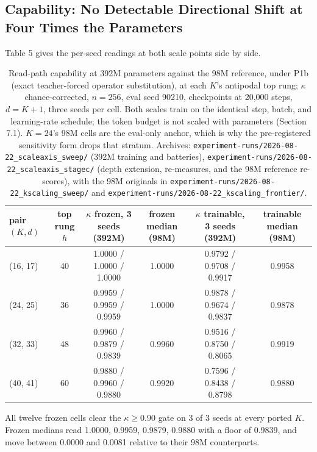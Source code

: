 \subsection{Capability: No Detectable Directional Shift at Four Times the Parameters}

Table 5 gives the per-seed readings at both scale points side by side.

\begin{table}[t]
\centering
\caption{Read-path capability at 392M parameters against the 98M reference, under P1b (exact teacher-forced operator substitution), at each $K$'s antipodal top rung; $\kappa$ chance-corrected, $n{=}256$, eval seed 90210, checkpoints at 20,000 steps, $d = K{+}1$, three seeds per cell. Both scales train on the identical step, batch, and learning-rate schedule; the token budget is not scaled with parameters (Section 7.1). $K{=}24$'s 98M cells are the eval-only anchor, which is why the pre-registered sensitivity form drops that stratum. Archives: \texttt{experiment-runs/2026-08-22\_scaleaxis\_sweep/} (392M training and batteries), \texttt{experiment-runs/2026-08-22\_scaleaxis\_stagec/} (depth extension, re-measures, and the 98M reference re-scores), with the 98M originals in \texttt{experiment-runs/2026-08-22\_kscaling\_sweep/} and \texttt{experiment-runs/2026-08-22\_kscaling\_frontier/}.}
\label{tab:scale-capability}
\small
\begin{tabular}{lccccc}
\toprule
pair $(K, d)$ & top rung $h$ & $\kappa$ frozen, 3 seeds (392M) & frozen median (98M) & $\kappa$ trainable, 3 seeds (392M) & trainable median (98M) \\
\midrule
(16, 17) & 40 & 1.0000 / 1.0000 / 1.0000 & 1.0000 & 0.9792 / 0.9708 / 0.9917 & 0.9958 \\
(24, 25) & 36 & 0.9959 / 0.9959 / 0.9959 & 1.0000 & 0.9878 / 0.9674 / 0.9837 & 0.9878 \\
(32, 33) & 48 & 0.9960 / 0.9879 / 0.9839 & 0.9960 & 0.9516 / 0.8750 / 0.8065 & 0.9919 \\
(40, 41) & 60 & 0.9880 / 0.9960 / 0.9880 & 0.9920 & 0.7596 / 0.8438 / 0.8798 & 0.9880 \\
\bottomrule
\end{tabular}
\end{table}

All twelve frozen cells clear the $\kappa \geq 0.90$ gate on 3 of 3
seeds at every ported $K$. Frozen medians read 1.0000, 0.9959, 0.9879,
0.9880 with a floor of 0.9839, and move between 0.0000 and 0.0081
relative to their 98M counterparts.

